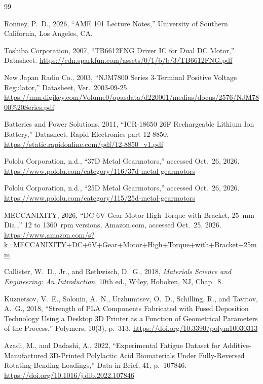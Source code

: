 
\clearpage
\renewcommand{\refname}{References}
\begin{thebibliography}{99}
\setlength{\itemsep}{2pt}
\small

Ronney, P.~D., 2026, ``AME 101 Lecture Notes,'' University of Southern California, Los Angeles, CA.

Toshiba Corporation, 2007, ``TB6612FNG Driver IC for Dual DC Motor,'' Datasheet.
\url{https://cdn.sparkfun.com/assets/0/1/b/b/3/TB6612FNG.pdf}

New Japan Radio Co., 2003, ``NJM7800 Series 3-Terminal Positive Voltage Regulator,'' Datasheet, Ver.~2003-09-25.
\url{https://mm.digikey.com/Volume0/opasdata/d220001/medias/docus/2576/NJM7800%20Series.pdf}

Batteries and Power Solutions, 2011, ``ICR-18650 26F Rechargeable Lithium Ion Battery,'' Datasheet, Rapid Electronics part 12-8850.
\url{https://static.rapidonline.com/pdf/12-8850_v1.pdf}

Pololu Corporation, n.d., ``37D Metal Gearmotors,'' accessed Oct.~26, 2026.
\url{https://www.pololu.com/category/116/37d-metal-gearmotors}

Pololu Corporation, n.d., ``25D Metal Gearmotors,'' accessed Oct.~26, 2026.
\url{https://www.pololu.com/category/115/25d-metal-gearmotors}

MECCANIXITY, 2026, ``DC 6V Gear Motor High Torque with Bracket, 25~mm Dia.,'' 12 to 1360~rpm versions, Amazon.com, accessed Oct.~25, 2026.
\url{https://www.amazon.com/s?k=MECCANIXITY+DC+6V+Gear+Motor+High+Torque+with+Bracket+25mm}

Callister, W.~D., Jr., and Rethwisch, D.~G., 2018, \textit{Materials Science and Engineering: An Introduction}, 10th ed., Wiley, Hoboken, NJ, Chap.~8.

Kuznetsov, V.~E., Solonin, A.~N., Urzhumtsev, O.~D., Schilling, R., and Tavitov, A.~G., 2018, ``Strength of PLA Components Fabricated with Fused Deposition Technology Using a Desktop 3D Printer as a Function of Geometrical Parameters of the Process,'' Polymers, 10(3), p.~313.
\url{https://doi.org/10.3390/polym10030313}

Azadi, M., and Dadashi, A., 2022, ``Experimental Fatigue Dataset for Additive-Manufactured 3D-Printed Polylactic Acid Biomaterials Under Fully-Reversed Rotating-Bending Loadings,'' Data in Brief, 41, p.~107846.
\url{https://doi.org/10.1016/j.dib.2022.107846}


\end{thebibliography}
